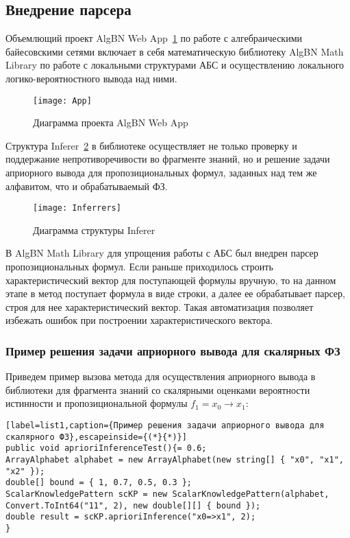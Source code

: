 \subsection{Внедрение парсера}

Объемлющий проект AlgBN Web App~\ref{App} по работе с алгебраическими байесовскими сетями включает в себя математическую библиотеку AlgBN Math Library по работе с локальными структурами АБС и осуществлению локального логико-вероятностного вывода над ними.  

\begin{figure}[h!]
\begin{center}
\texttt{[image: App]}
\caption{Диаграмма проекта AlgBN Web App}
\label{App}
\end{center}
\end{figure}

Структура Inferer~\ref{Inf} в библиотеке осуществляет не только проверку и поддержание непротиворечивости во фрагменте знаний, но и решение задачи априорного вывода для пропозициональных формул, заданных над тем же алфавитом, что и обрабатываемый ФЗ. 

\begin{figure}[h!]
\begin{center}
\texttt{[image: Inferrers]}
\caption{Диаграмма структуры Inferer}
\label{Inf}
\end{center}
\end{figure}

В AlgBN Math Library для упрощения работы с АБС был внедрен парсер~\cite{nsmv_apr} пропозициональных формул. Если раньше приходилось строить характеристический вектор для поступающей формулы вручную, то на данном этапе в метод поступает формула в виде строки, а далее ее обрабатывает парсер, строя для нее характеристический вектор. Такая автоматизация позволяет избежать ошибок при построении характеристического вектора.

\subsubsection{Пример решения задачи априорного вывода для скалярных ФЗ}

Приведем пример вызова метода для осуществления априорного вывода в библиотеки для фрагмента знаний со скалярными оценками вероятности истинности и пропозициональной формулы $f_1 = x_0 \rightarrow x_1$:

\begin{lstlisting}[label=list1,caption={Пример решения задачи априорного вывода для скалярного ФЗ},escapeinside={(*}{*)}]
public void aprioriInferenceTest(){= 0.6;
ArrayAlphabet alphabet = new ArrayAlphabet(new string[] { "x0", "x1", "x2" });
double[] bound = { 1, 0.7, 0.5, 0.3 };
ScalarKnowledgePattern scKP = new ScalarKnowledgePattern(alphabet, Convert.ToInt64("11", 2), new double[][] { bound });
double result = scKP.aprioriInference("x0=>x1", 2);
}
\end{lstlisting}

